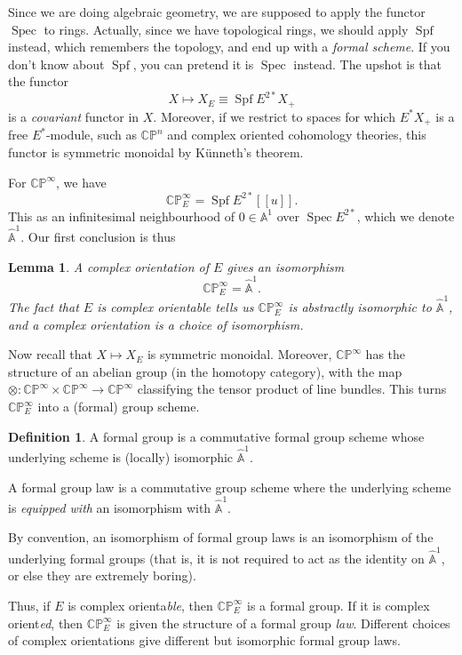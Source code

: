\documentclass{shortart}
\newtheorem{lemma}[thm]{Lemma}
\theoremstyle{definition}
\newtheorem{defi}[thm]{Definition}
\DeclareMathOperator\Spec{Spec}
\DeclareMathOperator\Spf{Spf}
\newcommand\A{\mathbb{A}}
\newcommand\CP{\mathbb{CP}}
\begin{document}
Since we are doing algebraic geometry, we are supposed to apply the functor $\Spec$ to rings. Actually, since we have topological rings, we should apply $\Spf$ instead, which remembers the topology, and end up with a \emph{formal scheme}. If you don't know about $\Spf$, you can pretend it is $\Spec$ instead. The upshot is that the functor
\[
  X \mapsto X_E \equiv \Spf E^{2*} X_+
\]
is a \emph{covariant} functor in $X$. Moreover, if we restrict to spaces for which $E^*X_+$ is a free $E^*$-module, such as $\CP^n$ and complex oriented cohomology theories, this functor is symmetric monoidal by K\"unneth's theorem.

For $\CP^\infty$, we have
\[
  \CP^\infty_E = \Spf E^{2*}[\![u]\!].
\]
This as an infinitesimal neighbourhood of $0 \in \A^1$ over $\Spec E^{2*}$, which we denote $\hat{\A}^1$. Our first conclusion is thus
\begin{lemma}
  A complex orientation of $E$ gives an isomorphism
  \[
    \CP^\infty_E = \hat{\A}^1.
  \]
  The fact that $E$ is complex orienta\emph{ble} tells us $\CP^\infty_E$ is abstractly isomorphic to $\hat{\A}^1$, and a complex orientation is a choice of isomorphism.
\end{lemma}

Now recall that $X \mapsto X_E$ is symmetric monoidal. Moreover, $\CP^\infty$ has the structure of an abelian group (in the homotopy category), with the map $\otimes: \CP^\infty \times \CP^\infty \to \CP^\infty$ classifying the tensor product of line bundles. This turns $\CP^\infty_E$ into a (formal) group scheme.

\begin{defi}
  A formal group is a commutative formal group scheme whose underlying scheme is (locally) isomorphic $\hat{\A}^1$.

  A formal group law is a commutative group scheme where the underlying scheme is \emph{equipped with} an isomorphism with $\hat{\A}^1$.

  By convention, an isomorphism of formal group laws is an isomorphism of the underlying formal groups (that is, it is not required to act as the identity on $\hat{\A}^1$, or else they are extremely boring).
\end{defi}
Thus, if $E$ is complex orienta\emph{ble}, then $\CP^\infty_E$ is a formal group. If it is complex orient\emph{ed}, then $\CP^\infty_E$ is given the structure of a formal group \emph{law}. Different choices of complex orientations give different but isomorphic formal group laws.
\end{document}
